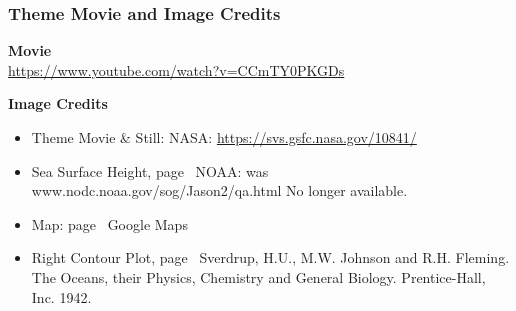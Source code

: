 \documentclass[xcolor=dvipsnames]{beamer}
\begin{document}
\begin{frame}
\frametitle{Theme Movie and Image Credits}

{\bf Movie}\\
\url{https://www.youtube.com/watch?v=CCmTY0PKGDs}

\vspace{0.5in}

{\bf Image Credits}
\begin{itemize}
\item Theme Movie \& Still: NASA: {\tiny \url{https://svs.gsfc.nasa.gov/10841/}}
\item Sea Surface Height, page~\pageref{ssh_image} NOAA: {\tiny was www.nodc.noaa.gov/sog/Jason2/qa.html No longer available.}
\item Map: page~\pageref{florida_straits_1} Google Maps
\item Right Contour Plot, page~\pageref{florida_straits_2} Sverdrup, H.U., M.W. Johnson and R.H. Fleming.  The Oceans, their Physics, Chemistry and General Biology. Prentice-Hall, Inc. 1942. 
\end{itemize}

\end{frame}
\end{document}
